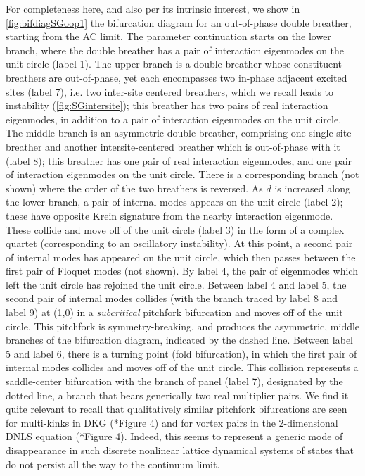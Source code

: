 \documentclass[12pt,reqno]{amsart}
\theoremstyle{definition}
\begin{document}
For completeness here, and also per its intrinsic interest,
we show in 
\cref{fig:bifdiagSGoop1} the bifurcation diagram for an out-of-phase double breather, starting from the AC limit. The parameter continuation starts on the lower branch, where the double breather has a pair of interaction eigenmodes on the unit circle (label 1). The upper branch is a double breather whose constituent breathers
are out-of-phase, yet each encompasses two in-phase adjacent excited sites (label 7), i.e. two inter-site centered breathers, which we recall leads
to instability (\cref{fig:SGintersite}); this breather has two pairs of real interaction eigenmodes, in addition to a pair of interaction eigenmodes on the unit circle. The middle branch is an asymmetric double breather, comprising one single-site breather and another intersite-centered breather which is out-of-phase with it (label 8); this breather has one pair of real interaction eigenmodes, and one pair of interaction eigenmodes on the unit circle. There is a corresponding branch (not shown) where the order of the two breathers is reversed. As $d$ is increased along the lower branch, a pair of internal modes appears on the unit circle (label 2); these have opposite Krein signature from the nearby interaction eigenmode. These collide and move off of the unit circle (label 3) in the form of a complex quartet (corresponding to an oscillatory instability). At this point, a second pair of internal modes has appeared on the unit circle, which then passes between the first pair of Floquet modes (not shown). By label 4, the pair of eigenmodes which left the unit circle has rejoined the unit circle. Between label 4 and label 5, the second pair of internal modes collides (with the branch traced by label 8 and label 9) at (1,0) in a {\it subcritical} pitchfork bifurcation and moves off of the unit circle. This pitchfork is symmetry-breaking, and produces the asymmetric, middle branches of the bifurcation diagram, indicated by the
dashed line. Between label 5 and label 6, there is a turning point (fold bifurcation), in which the first pair of internal modes collides and moves off of the unit circle. 
This collision represents a saddle-center bifurcation with the
branch of panel (label 7), designated by the dotted line, a branch
that bears generically two real multiplier pairs. We find it
quite relevant to recall that
qualitatively similar pitchfork bifurcations are seen for multi-kinks in DKG (\cite{Parker2021}*{Figure 4}) and for vortex pairs in the 2-dimensional DNLS equation (\cite{Bramburger2020}*{Figure 4}).
Indeed, this seems to represent a generic mode of disappearance
in such discrete nonlinear lattice dynamical systems of states
that do not persist all the way to the continuum limit.
\end{document}
